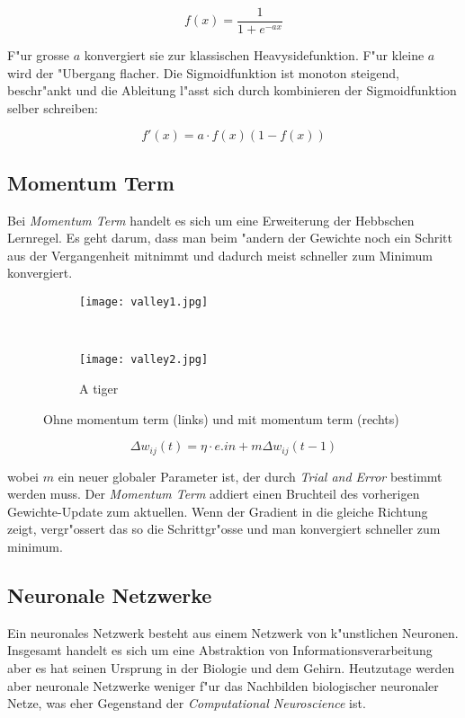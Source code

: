 \documentclass[10pt]{article}
\begin{document}
\[ f(x) = \frac{1}{1+e^{-ax}}\]

F"ur grosse $a$ konvergiert sie zur klassischen Heavysidefunktion. F"ur kleine $a$ wird der "Ubergang flacher. Die Sigmoidfunktion ist monoton steigend, beschr"ankt und die Ableitung l"asst sich durch kombinieren der Sigmoidfunktion selber schreiben:

\[ f'(x) = a\cdot f(x)(1-f(x)) \]
\subsection{Momentum Term}

Bei \textit{Momentum Term} handelt es sich um eine Erweiterung der Hebbschen Lernregel. Es geht darum, dass man beim "andern der Gewichte noch ein Schritt aus der Vergangenheit mitnimmt und dadurch meist schneller zum Minimum konvergiert.

\begin{figure}[h]
        \centering
        \begin{subfigure}[b]{0.5\textwidth}
                \centering
                \texttt{[image: valley1.jpg]}
                \label{fig:valley1}
        \end{subfigure}%
        ~ %
        \begin{subfigure}[b]{0.5\textwidth}
                \centering
                \texttt{[image: valley2.jpg]}
                \caption{A tiger}
                \label{fig:valley2}
        \end{subfigure}
\caption{Ohne momentum term (links) und mit momentum term (rechts)\cite{momterm}}
\end{figure}

\[ \Delta w_{ij}(t) = \eta\cdot e.in + m\Delta w_{ij}(t-1) \]

wobei $m$ ein neuer globaler Parameter ist, der durch \textit{Trial and Error} bestimmt werden muss. Der \textit{Momentum Term} addiert einen Bruchteil des vorherigen Gewichte-Update zum aktuellen. Wenn der Gradient in die gleiche Richtung zeigt, vergr"ossert das so die Schrittgr"osse und man konvergiert schneller zum minimum.

\subsection{Neuronale Netzwerke}

Ein neuronales Netzwerk besteht aus einem Netzwerk von k"unstlichen Neuronen. Insgesamt handelt es sich um eine Abstraktion von Informationsverarbeitung aber es hat seinen Ursprung in der Biologie und dem Gehirn. Heutzutage werden aber neuronale Netzwerke weniger f"ur das Nachbilden biologischer neuronaler Netze, was eher Gegenstand der \textit{Computational Neuroscience} ist.
\end{document}
